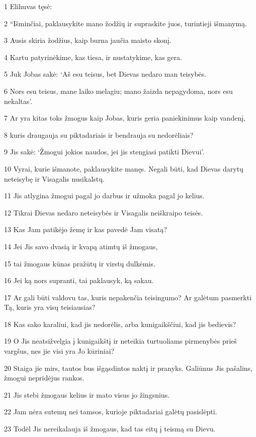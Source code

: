 \par 1 Elihuvas tęsė: 
\par 2 “Išminčiai, paklausykite mano žodžių ir supraskite juos, turintieji išmanymą. 
\par 3 Ausis skiria žodžius, kaip burna jaučia maisto skonį. 
\par 4 Kartu patyrinėkime, kas tiesa, ir nustatykime, kas gera. 
\par 5 Juk Jobas sakė: ‘Aš esu teisus, bet Dievas nedaro man teisybės. 
\par 6 Nors esu teisus, mane laiko melagiu; mano žaizda nepagydoma, nors esu nekaltas’. 
\par 7 Ar yra kitas toks žmogus kaip Jobas, kuris geria paniekinimus kaip vandenį, 
\par 8 kuris draugauja su piktadariais ir bendrauja su nedorėliais? 
\par 9 Jis sakė: ‘Žmogui jokios naudos, jei jis stengiasi patikti Dievui’. 
\par 10 Vyrai, kurie išmanote, paklausykite manęs. Negali būti, kad Dievas darytų neteisybę ir Visagalis nusikalstų. 
\par 11 Jis atlygina žmogui pagal jo darbus ir užmoka pagal jo kelius. 
\par 12 Tikrai Dievas nedaro neteisybės ir Visagalis neiškraipo teisės. 
\par 13 Kas Jam patikėjo žemę ir kas pavedė Jam visatą? 
\par 14 Jei Jis savo dvasią ir kvapą atimtų iš žmogaus, 
\par 15 tai žmogaus kūnas pražūtų ir virstų dulkėmis. 
\par 16 Jei ką nors supranti, tai paklausyk, ką sakau. 
\par 17 Ar gali būti valdovu tas, kuris nepakenčia teisingumo? Ar galėtum pasmerkti Tą, kuris yra visų teisiausias? 
\par 18 Kas sako karaliui, kad jis nedorėlis, arba kunigaikščiui, kad jis bedievis? 
\par 19 O Jis neatsižvelgia į kunigaikštį ir neteikia turtuoliams pirmenybės prieš vargšus, nes jie visi yra Jo kūriniai? 
\par 20 Staiga jie mirs, tautos bus išgąsdintos naktį ir pranyks. Galiūnus Jis pašalins, žmogui nepridėjus rankos. 
\par 21 Jis stebi žmogaus kelius ir mato visus jo žingsnius. 
\par 22 Jam nėra sutemų nei tamsos, kurioje piktadariai galėtų pasislėpti. 
\par 23 Todėl Jis nereikalauja iš žmogaus, kad tas eitų į teismą su Dievu. 

